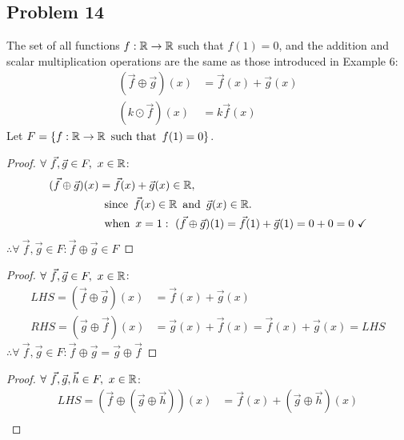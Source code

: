 \documentclass{article}
\begin{document}
\subsection*{Problem 14} The set of all functions $f: \mathbb{R} \rightarrow \mathbb{R}$ such that $f(1)=0$,
and the addition and scalar multiplication operations are the same as those introduced in Example 6:
\begin{align*}
    (\vec{f} \oplus \vec{g})(x) & = \vec{f}(x) + \vec{g}(x) \\
    (k \odot \vec{f})(x)        & = k\vec{f}(x)
\end{align*}
Let $F = \{f: \mathbb{R} \rightarrow \mathbb{R} \operatorname{~\text{such that}~} f(1) = 0\}$.
\begin{enumerate}
    \begin{proof}
        $\forall~\vec{f},\vec{g} \in F,~x \in \mathbb{R}$:
        \begin{align*}
            (\vec{f} \oplus \vec{g})(x) & = \vec{f}(x) + \vec{g}(x) \in \mathbb{R},                                                     \\
                                        & \operatorname{~\text{since}~} \vec{f}(x) \in \mathbb{R} \operatorname{~\text{and}~} \vec{g}(x) \in \mathbb{R}.                                \\
                                        & \operatorname{~\text{when}~} x=1:~(\vec{f} \oplus \vec{g})(1) = \vec{f}(1) + \vec{g}(1)  = 0 + 0 = 0~\checkmark
        \end{align*}
        $\therefore \forall~\vec{f},\vec{g} \in F: \vec{f} \oplus \vec{g} \in F$
    \end{proof}
    \begin{proof}
        $\forall~\vec{f},\vec{g} \in F,~x \in \mathbb{R}$:
        \begin{align*}
            LHS = (\vec{f} \oplus \vec{g})(x) & = \vec{f}(x) + \vec{g}(x)                                 \\
            RHS = (\vec{g} \oplus \vec{f})(x) & = \vec{g}(x) + \vec{f}(x) = \vec{f}(x) + \vec{g}(x) = LHS
        \end{align*}
        $\therefore \forall~\vec{f},\vec{g} \in F: \vec{f} \oplus \vec{g} = \vec{g} \oplus \vec{f}$
    \end{proof}
    \begin{proof}
        $\forall~\vec{f},\vec{g},\vec{h} \in F,~x \in \mathbb{R}$:
        \begin{align*}
            LHS = (\vec{f} \oplus (\vec{g} \oplus \vec{h}))(x) & = \vec{f}(x) + (\vec{g} \oplus \vec{h})(x)     \\

\end{align*}
\end{proof}
\end{enumerate}
\end{document}
